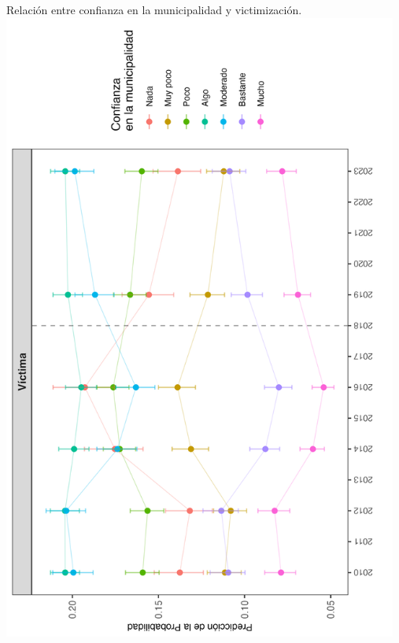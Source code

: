 \documentclass[letterpaper]{article}
\begin{document}
\begin{center}
Relación entre confianza en la municipalidad y victimización.
\includegraphics[width = 13cm]{plot_mun_02.png}
    \label{tab:plot4}
\end{center}

\newpage
\end{document}
